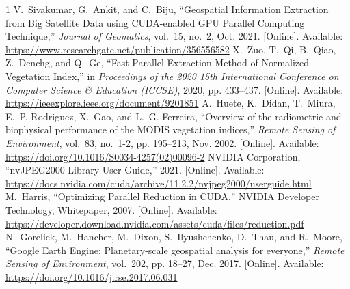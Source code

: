 \documentclass[10pt,conference,compsoc]{IEEEtran}
\begin{document}
\begin{thebibliography}{1}
V.~Sivakumar, G.~Ankit, and C.~Biju, ``Geospatial Information Extraction from Big Satellite Data using CUDA-enabled GPU Parallel Computing Technique,'' \emph{Journal of Geomatics}, vol.~15, no.~2, Oct. 2021. [Online]. Available: \url{https://www.researchgate.net/publication/356556582}
X.~Zuo, T.~Qi, B.~Qiao, Z.~Denchg, and Q.~Ge, ``Fast Parallel Extraction Method of Normalized Vegetation Index,'' in \emph{Proceedings of the 2020 15th International Conference on Computer Science \& Education (ICCSE)}, 2020, pp. 433--437. [Online]. Available: \url{https://ieeexplore.ieee.org/document/9201851}
A.~Huete, K.~Didan, T.~Miura, E.~P. Rodriguez, X.~Gao, and L.~G. Ferreira, ``Overview of the radiometric and biophysical performance of the MODIS vegetation indices,'' \emph{Remote Sensing of Environment}, vol.~83, no.~1-2, pp. 195--213, Nov. 2002. [Online]. Available: \url{https://doi.org/10.1016/S0034-4257(02)00096-2}
NVIDIA Corporation, ``nvJPEG2000 Library User Guide,'' 2021. [Online]. Available: \url{https://docs.nvidia.com/cuda/archive/11.2.2/nvjpeg2000/userguide.html}
M.~Harris, ``Optimizing Parallel Reduction in CUDA,'' NVIDIA Developer Technology, Whitepaper, 2007. [Online]. Available: \url{https://developer.download.nvidia.com/assets/cuda/files/reduction.pdf}
N.~Gorelick, M.~Hancher, M.~Dixon, S.~Ilyushchenko, D.~Thau, and R.~Moore, ``Google Earth Engine: Planetary-scale geospatial analysis for everyone,'' \emph{Remote Sensing of Environment}, vol.~202, pp. 18--27, Dec. 2017. [Online]. Available: \url{https://doi.org/10.1016/j.rse.2017.06.031}

\end{thebibliography}
\end{document}
